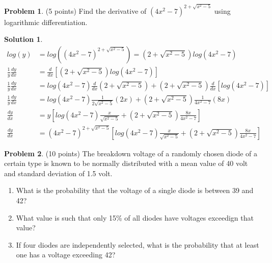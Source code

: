 \documentclass[11pt]{article}
\theoremstyle{definition}
\newtheorem{problem}{Problem}
\newtheorem*{solution}{Solution}
\begin{document}

\begin{problem}
(5 points)  Find the derivative of $(4x^2 - 7)^{2+\sqrt{x^2 - 5}}$ using logarithmic differentiation.
\end{problem}

\begin{solution}
    \begin{align}
        log(y) &= log((4x^2 - 7)^{2+\sqrt{x^2 - 5}}) = (2+\sqrt{x^2 - 5})log(4x^2 - 7) \\
        \frac{1}{y} \frac{dy}{dx} &= \frac{d}{dx}[(2+\sqrt{x^2 - 5})log(4x^2 - 7)] \\
        \frac{1}{y} \frac{dy}{dx} &= log(4x^2 - 7) \frac{d}{dx}(2+\sqrt{x^2 - 5}) + (2+\sqrt{x^2 - 5}) \frac{d}{dx}[log(4x^2 - 7)] \\
        \frac{1}{y} \frac{dy}{dx} &= log(4x^2 - 7) \frac{1}{2\sqrt{x^2 - 5}}(2x) + (2+\sqrt{x^2 - 5}) \frac{1}{4x^2 - 7}(8x) \\
        \frac{dy}{dx} &= y [ log(4x^2 - 7) \frac{x}{\sqrt{x^2 - 5}} + (2+\sqrt{x^2 - 5}) \frac{8x}{4x^2 - 7} ] \\
        \frac{dy}{dx} &= (4x^2 - 7)^{2+\sqrt{x^2 - 5}} [ log(4x^2 - 7) \frac{x}{\sqrt{x^2 - 5}} + (2+\sqrt{x^2 - 5}) \frac{8x}{4x^2 - 7} ]
    \end{align}
\end{solution}


\begin{problem}
(10 points) The breakdown voltage of a randomly chosen diode of a certain type is known to be normally distributed with a mean value of 
40 volt and standard deviation of 1.5 volt.
\begin{enumerate}
    \item What is the probability that the voltage of a single diode is between 39 and 42?
    \item What value is such that only 15\% of all diodes have voltages exceedign that value?
    \item If four diodes are independently selected, what is the probability that at least one has a voltage exceeding 42?
\end{enumerate}
\end{problem}
\end{document}
